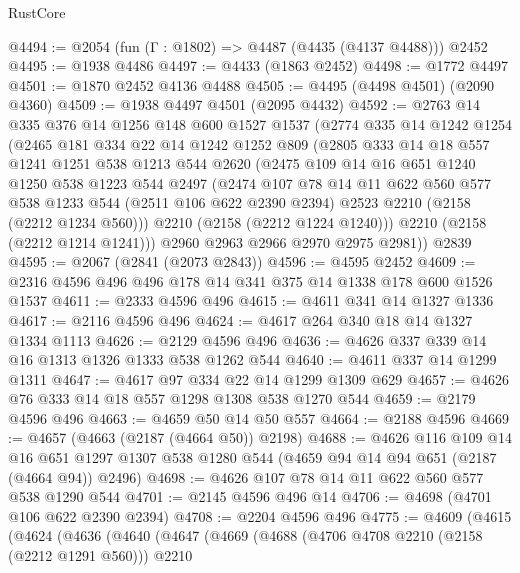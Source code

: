 \begin{lexlean}{RustCore}
\begin{coremodule}
@4494 := @2054 (fun (Γ : @1802) => @4487 (@4435 (@4137 @4488))) @2452
@4495 := @1938 @4486
@4497 := @4433 (@1863 @2452)
@4498 := @1772 @4497
@4501 := @1870 @2452 @4136 @4488
@4505 := @4495 (@4498 @4501) (@2090 @4360)
@4509 := @1938 @4497 @4501 (@2095 @4432)
@4592 := @2763
    @14
    @335
    @376
    @14
    @1256
    @148
    @600
    @1527
    @1537
    (@2774
      @335
      @14
      @1242
      @1254
      (@2465
        @181
        @334
        @22
        @14
        @1242
        @1252
        @809
        (@2805
          @333
          @14
          @18
          @557
          @1241
          @1251
          @538
          @1213
          @544
          @2620
          (@2475
            @109
            @14
            @16
            @651
            @1240
            @1250
            @538
            @1223
            @544
            @2497
            (@2474
              @107
              @78
              @14
              @11
              @622
              @560
              @577
              @538
              @1233
              @544
              (@2511 @106 @622 @2390 @2394)
              @2523
              @2210
              (@2158 (@2212 @1234 @560)))
            @2210
            (@2158 (@2212 @1224 @1240)))
          @2210
          (@2158 (@2212 @1214 @1241)))
        @2960
        @2963
        @2966
        @2970
        @2975
        @2981))
    @2839
@4595 := @2067 (@2841 (@2073 @2843))
@4596 := @4595 @2452
@4609 := @2316 @4596 @496 @496 @178 @14 @341 @375 @14 @1338 @178 @600 @1526 @1537
@4611 := @2333 @4596 @496
@4615 := @4611 @341 @14 @1327 @1336
@4617 := @2116 @4596 @496
@4624 := @4617 @264 @340 @18 @14 @1327 @1334 @1113
@4626 := @2129 @4596 @496
@4636 := @4626 @337 @339 @14 @16 @1313 @1326 @1333 @538 @1262 @544
@4640 := @4611 @337 @14 @1299 @1311
@4647 := @4617 @97 @334 @22 @14 @1299 @1309 @629
@4657 := @4626 @76 @333 @14 @18 @557 @1298 @1308 @538 @1270 @544
@4659 := @2179 @4596 @496
@4663 := @4659 @50 @14 @50 @557
@4664 := @2188 @4596
@4669 := @4657 (@4663 (@2187 (@4664 @50)) @2198)
@4688 := @4626
    @116
    @109
    @14
    @16
    @651
    @1297
    @1307
    @538
    @1280
    @544
    (@4659 @94 @14 @94 @651 (@2187 (@4664 @94)) @2496)
@4698 := @4626 @107 @78 @14 @11 @622 @560 @577 @538 @1290 @544
@4701 := @2145 @4596 @496 @14
@4706 := @4698 (@4701 @106 @622 @2390 @2394)
@4708 := @2204 @4596 @496
@4775 := @4609
    (@4615
      (@4624
        (@4636
          (@4640
            (@4647
              (@4669
                (@4688
                  (@4706 @4708 @2210 (@2158 (@2212 @1291 @560)))
                  @2210

\end{coremodule}
\end{lexlean}
